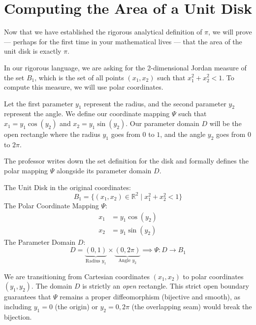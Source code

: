 \setcounter{section}{3} %

\section{Computing the Area of a Unit Disk}

\begin{spoken-clean}[00:15:00 - 00:18:37]
Now that we have established the rigorous analytical definition of $\pi$, we will prove — perhaps for the first time in your mathematical lives — that the area of the unit disk is exactly $\pi$. 

In our rigorous language, we are asking for the 2-dimensional Jordan measure of the set $B_1$, which is the set of all points $(x_1, x_2)$ such that $x_1^2 + x_2^2 < 1$. To compute this measure, we will use polar coordinates. 

Let the first parameter $y_1$ represent the radius, and the second parameter $y_2$ represent the angle. We define our coordinate mapping $\Psi$ such that $x_1 = y_1 \cos(y_2)$ and $x_2 = y_1 \sin(y_2)$. Our parameter domain $D$ will be the open rectangle where the radius $y_1$ goes from $0$ to $1$, and the angle $y_2$ goes from $0$ to $2\pi$.
\end{spoken-clean}

\begin{nice-box}
The professor writes down the set definition for the disk and formally defines the polar mapping $\Psi$ alongside its parameter domain $D$.
\end{nice-box}

\begin{math-stroke}
The Unit Disk in the original coordinates:
\[
B_1 = \{ (x_1, x_2) \in \mathbb{R}^2 \mid x_1^2 + x_2^2 < 1 \}
\]
The Polar Coordinate Mapping $\Psi$:
\begin{align*}
x_1 &= y_1 \cos(y_2) \\
x_2 &= y_1 \sin(y_2)
\end{align*}
The Parameter Domain $D$:
\[
D = \underbrace{(0,1)}_{\text{Radius } y_1} \times \underbrace{(0, 2\pi)}_{\text{Angle } y_2} \implies \Psi: D \to B_1
\]

\begin{explanation-of-steps}
We are transitioning from Cartesian coordinates $(x_1, x_2)$ to polar coordinates $(y_1, y_2)$. The domain $D$ is strictly an \textit{open} rectangle. This strict open boundary guarantees that $\Psi$ remains a proper diffeomorphism (bijective and smooth), as including $y_1 = 0$ (the origin) or $y_2 = 0, 2\pi$ (the overlapping seam) would break the bijection.
\end{explanation-of-steps}
\end{math-stroke}


